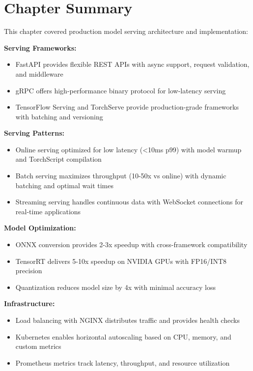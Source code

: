 \section{Chapter Summary}

This chapter covered production model serving architecture and implementation:

\textbf{Serving Frameworks:}
\begin{itemize}
    \item FastAPI provides flexible REST APIs with async support, request validation, and middleware
    \item gRPC offers high-performance binary protocol for low-latency serving
    \item TensorFlow Serving and TorchServe provide production-grade frameworks with batching and versioning
\end{itemize}

\textbf{Serving Patterns:}
\begin{itemize}
    \item Online serving optimized for low latency (<10ms p99) with model warmup and TorchScript compilation
    \item Batch serving maximizes throughput (10-50x vs online) with dynamic batching and optimal wait times
    \item Streaming serving handles continuous data with WebSocket connections for real-time applications
\end{itemize}

\textbf{Model Optimization:}
\begin{itemize}
    \item ONNX conversion provides 2-3x speedup with cross-framework compatibility
    \item TensorRT delivers 5-10x speedup on NVIDIA GPUs with FP16/INT8 precision
    \item Quantization reduces model size by 4x with minimal accuracy loss
\end{itemize}

\textbf{Infrastructure:}
\begin{itemize}
    \item Load balancing with NGINX distributes traffic and provides health checks
    \item Kubernetes enables horizontal autoscaling based on CPU, memory, and custom metrics
    \item Prometheus metrics track latency, throughput, and resource utilization
\end{itemize}


